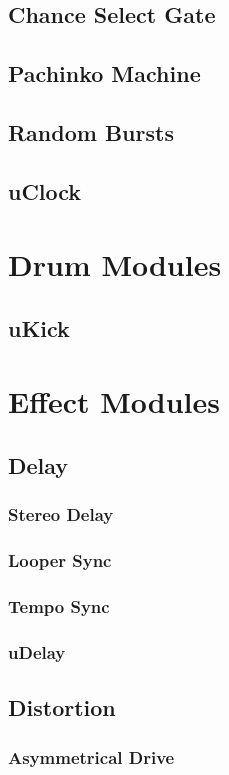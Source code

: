 \documentclass[11pt]{book}
\begin{document}
\section{Chance Select Gate}
\section{Pachinko Machine}
\section{Random Bursts}
\section{uClock}

\chapter{Drum Modules}
\section{uKick}

\chapter{Effect Modules}
\section{Delay}
\subsection{Stereo Delay}
\subsection{Looper Sync}
\subsection{Tempo Sync}
\subsection{uDelay}
\section{Distortion}
\subsection{Asymmetrical Drive}
\end{document}
